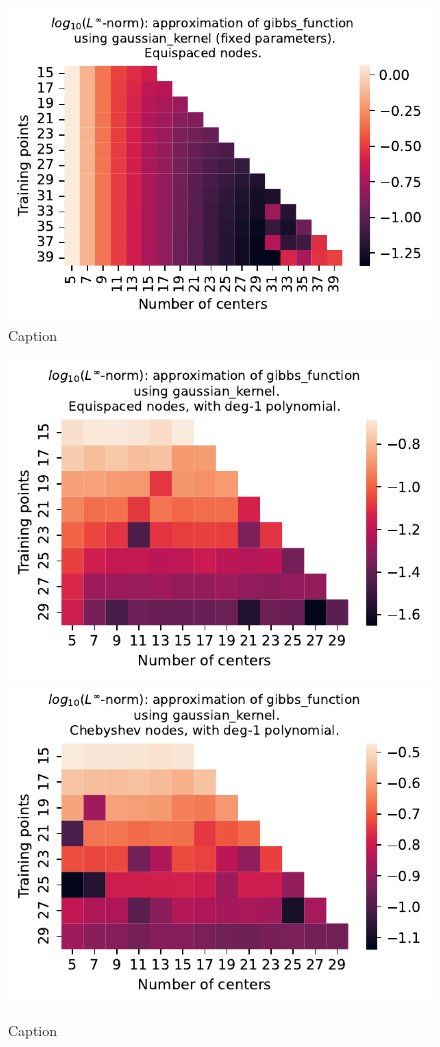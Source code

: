\documentclass[12pt]{report} %
\begin{document}
\begin{figure}[ht]
  \centering

  \includegraphics[width=.6\textwidth]{imagenes/experiments/1d/least_squares/gibbs_exact_solution_fucks_up.pdf}
  \caption{Caption}
  \label{fig:gibbs-gaussian-extended-lstsq}
\end{figure}


\begin{figure}[ht]
  \centering

  \includegraphics[width=.49\textwidth]{imagenes/experiments/1d/variational/gibbs_function-Kgaussian_kernel-Poly-Equi.pdf}
  \includegraphics[width=.49\textwidth]{imagenes/experiments/1d/variational/gibbs_function-Kgaussian_kernel-Poly-Cheb.pdf}
  \caption{Caption}
  \label{fig:gibbs-gaussian-poly}
\end{figure}
\end{document}
